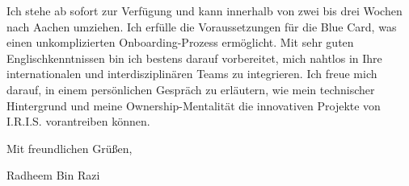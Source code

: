 \documentclass[11pt,a4paper]{coverletter}
\begin{document}
\bulletsend

Ich stehe ab sofort zur Verfügung und kann innerhalb von zwei bis drei Wochen nach Aachen umziehen. Ich erfülle die Voraussetzungen für die Blue Card, was einen unkomplizierten Onboarding-Prozess ermöglicht. Mit sehr guten Englischkenntnissen bin ich bestens darauf vorbereitet, mich nahtlos in Ihre internationalen und interdisziplinären Teams zu integrieren. Ich freue mich darauf, in einem persönlichen Gespräch zu erläutern, wie mein technischer Hintergrund und meine Ownership-Mentalität die innovativen Projekte von I.R.I.S. vorantreiben können.

\closing{Mit freundlichen Grüßen,}{Radheem Bin Razi}
\end{document}
